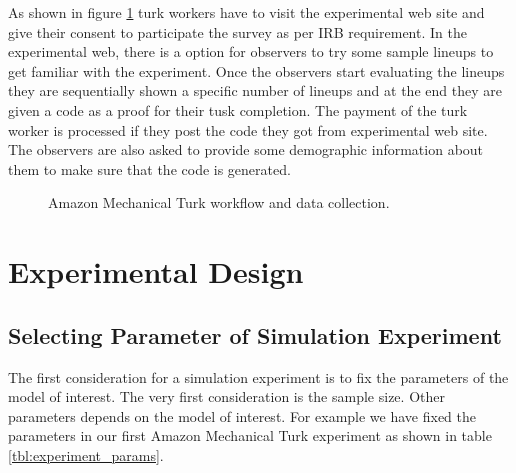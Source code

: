 \documentclass[11pt]{article}
\begin{document}
As shown in figure \ref{fig:turk_work_flow} turk workers have to visit the experimental web site and give their consent to participate the survey as per IRB requirement. In the experimental web, there is a option for observers to try some sample lineups to get familiar with the experiment. Once the observers start evaluating the lineups they are sequentially shown a specific number of lineups and at the end they are given a code as a proof for their tusk completion. The payment of the turk worker is processed if they post the code they got from experimental web site. The observers are also asked to provide some demographic information about them to make sure that the code is generated.

\begin{figure}[htbp]
   \centering
       \caption{Amazon Mechanical Turk workflow and data collection.}
       \label{fig:turk_work_flow}
\end{figure}


\section{Experimental Design} \label{sec:turk_exp}

\subsection{Selecting Parameter of Simulation Experiment} The first consideration for a simulation experiment is to fix the parameters of the model of interest. The very first consideration is the sample size. Other parameters depends on the model of interest. For example we have fixed the parameters in our first Amazon Mechanical Turk experiment as shown in table \ref{tbl:experiment_params}.
\end{document}
